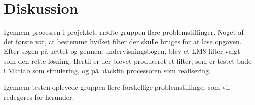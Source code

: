\graphicspath{{Chapters/Diskussion/}}


\section{Diskussion}
Igennem processen i projektet, mødte gruppen flere problemstillinger. Noget af det første var, at bestemme hvilket filter der skulle bruges for at løse opgaven. Efter søgen på nettet og gennem undervisningsbogen, blev et LMS filter valgt som den rette løsning. Hertil er der blevet produceret et filter, som er testet både i Matlab som simulering, og på blackfin processoren som realisering. 

Igennem testen oplevede gruppen flere forskellige problemstillinger som vil redegøres for herunder. 

